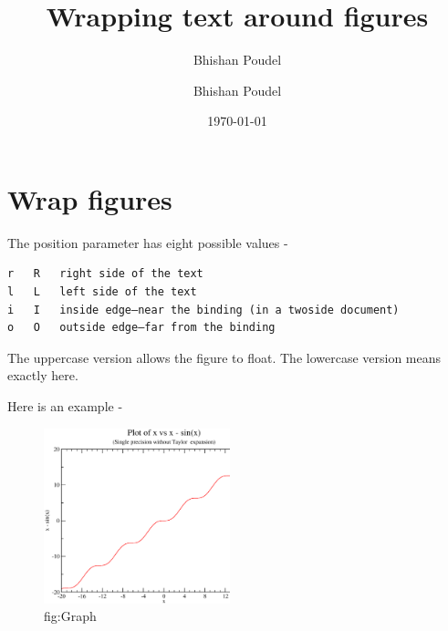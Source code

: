 \documentclass{article}
\title{Wrapping text around figures}
\author{Bhishan Poudel}
\date{\today}
\author{Bhishan Poudel}
\begin{document}
\title{}
\tableofcontents
\listoffigures

\section{Wrap figures}
The position parameter has eight possible values -
\begin{verbatim}
r 	R 	right side of the text
l 	L 	left side of the text
i 	I 	inside edge–near the binding (in a twoside document)
o 	O 	outside edge–far from the binding
\end{verbatim}

The uppercase version allows the figure to float. The lowercase version means exactly here.

Here is an example -

\begin{figure}
  \begin{center}
    \includegraphics[width=0.48\textwidth]{images/a.eps}
  \end{center}
  \caption{fig:Graph}
\end{figure}
\end{document}
